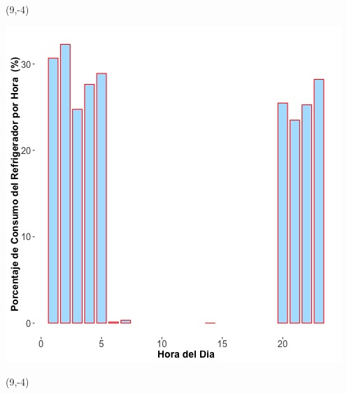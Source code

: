 \documentclass{article}\usepackage[]{graphicx}\usepackage[]{color}
\newenvironment{knitrout}{}{} %
\begin{document}
 \begin{textblock}{1}(9,-4)
\begin{minipage}{20em}
\begingroup

\endgroup
\end{minipage}
\end{textblock}

 \vspace{2cm}

\begin{knitrout}
\color{fgcolor}
\includegraphics[scale=0.65]{figure/A3_fridge_energy_pct.jpg} 
\end{knitrout}

 \begin{textblock}{1}(9,-4)
\begin{minipage}{20em}
\begingroup

\endgroup
\end{minipage}
\end{textblock}

 \vspace{20cm}
 
\end{document}
